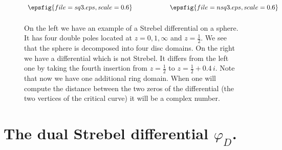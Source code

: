 \documentclass[11pt]{JHEP3}
\def\half{\frac{1}{2}}
\def\vf{\varphi}
\begin{document}
\begin{figure}[htbp]
 \begin{center}
 $\begin{array}{c@{\hspace{0.8in}}c}
\epsfig{file=sq3.eps,scale=0.6} & \epsfig{file=nsq3.eps,scale=0.6}
\\ [0.2cm]
\end{array}$
\caption{On the left we have an example of a Strebel differential on a sphere. It has four
double  poles located at $z=0,1,\infty$ and $z=\half$. We see that the sphere is decomposed
into four disc domains. On the right we have a differential which is not Strebel. 
It differs from the left one by taking  the fourth insertion from $z=\half$ to 
$z=\half+0.4\,i$. Note that now we have one additional ring domain. When one will
compute the distance between the two zeros of the differential (the two vertices of the critical curve) it will be a complex number.} \label{square}
\end{center}
\end{figure}

\section{The dual Strebel differential $\vf_D$.}\label{dual}
\end{document}

